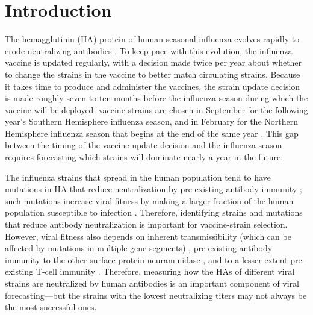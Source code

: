 \section{Introduction}

The hemagglutinin (HA) protein of human seasonal influenza evolves rapidly to erode neutralizing antibodies \citep{smith2004,bedford2014}. To keep pace with this evolution, the influenza vaccine is updated regularly, with a decision made twice per year about whether to change the strains in the vaccine to better match circulating strains. Because it takes time to produce and administer the vaccines, the strain update decision is made roughly seven to ten months before the influenza season during which the vaccine will be deployed: vaccine strains are chosen in September for the following year's Southern Hemisphere influenza season, and in February for the Northern Hemisphere influenza season that begins at the end of the same year \citep{who2026,who2025}. This gap between the timing of the vaccine update decision and the influenza season requires forecasting which strains will dominate nearly a year in the future.

The influenza strains that spread in the human population tend to have mutations in HA that reduce neutralization by pre-existing antibody immunity \citep{bedford2015,smith2004,luksza2014,huddleston2020,neher2016,kikawa2026b}; such mutations increase viral fitness by making a larger fraction of the human population susceptible to infection \citep{kim2024,petrie2016,hobson1972}. Therefore, identifying strains and mutations that reduce antibody neutralization is important for vaccine-strain selection. However, viral fitness also depends on inherent transmissibility (which can be affected by mutations in multiple gene segments) \citep{raghwani2017,liu2024}, pre-existing antibody immunity to the other surface protein neuraminidase \citep{krammer2019,monto2015}, and to a lesser extent pre-existing T-cell immunity \citep{machkovech2015,boon2002}. Therefore, measuring how the HAs of different viral strains are neutralized by human antibodies is an important component of viral forecasting---but the strains with the lowest neutralizing titers may not always be the most successful ones.

